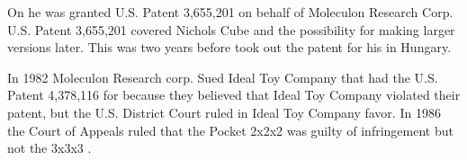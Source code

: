 On  he was granted U.S. Patent 3,655,201 on behalf of Moleculon Research Corp. U.S. Patent 3,655,201 covered Nichols Cube and the possibility for making larger versions later. This was two years before \erno{} took out the patent for his \rubik{} in Hungary. 

In 1982 Moleculon Research corp.  Sued Ideal Toy Company that had the U.S. Patent 4,378,116 for \rubik{} because they believed that Ideal Toy Company violated their patent, but the U.S. District Court ruled in Ideal Toy Company favor. In 1986 the Court of Appeals ruled that the Pocket \rubik{} 2x2x2 was guilty of infringement but not the 3x3x3 \rubik{}.

\myTail{

}
%
